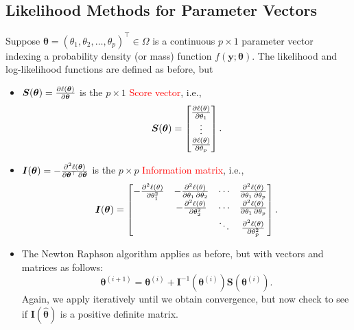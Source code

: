\documentclass[oneside]{book}\usepackage[]{graphicx}\usepackage[svgnames]{xcolor}
\providecommand{\Vector}[1]{\bm{#1}}%
\providecommand{\Matrix}[1]{\bm{#1}}
\begin{document}
\subsection*{Likelihood Methods for Parameter Vectors}
Suppose $ \Vector{\theta}=(\theta_1,\theta_2,\ldots,\theta_p)^\top\in \Omega $ is a continuous $ p\times 1 $ parameter vector
indexing a probability density (or mass) function $ f(\Vector{y};\Vector{\theta}) $. The likelihood and
log-likelihood functions are defined as before, but
\begin{itemize}
      \item $ \Vector{S}(\Vector{\theta})=\pdv{\ell( \Vector{\theta})}{ \Vector{\theta}} $ is the $ p\times 1 $ \textcolor{Red}{Score vector}, i.e.,
            \[ \Vector{S}(\Vector{\theta})=\begin{bmatrix}
                        \pdv{\ell(\theta)}{\theta_1} \\
                        \vdots                       \\
                        \pdv{\ell(\theta)}{\theta_p}
                  \end{bmatrix}. \]
      \item $ \Matrix{I}(\Vector{\theta})=-\pdv{\ell(\Vector{\theta})}{ \Vector{\theta}^\top,\Vector{\theta}} $ is the $ p\times p $ \textcolor{Red}{Information matrix}, i.e.,
            \[ \Matrix{I}(\Vector{\theta})=\begin{bmatrix}
                        -\pdv[order=2]{\ell(\theta)}{\theta_1} & -\pdv{\ell(\theta)}{\theta_1,\theta_2} & \cdots & \pdv{\ell(\theta)}{\theta_1,\theta_p} \\
                                                               & -\pdv[order=2]{\ell(\theta)}{\theta_2} & \cdots & \pdv{\ell(\theta)}{\theta_1,\theta_p} \\
                                                               &                                        & \ddots & \pdv[order=2]{\ell(\theta)}{\theta_p}
                  \end{bmatrix}. \]

\end{itemize}
\begin{itemize}
      \item The Newton Raphson algorithm applies as before, but with vectors and matrices
            as follows:
            \[ \Vector{\theta}^{(i+1)}=\Vector{\theta}^{(i)}+\Matrix{I}^{-1}(\Vector{\theta}^{(i)})\Vector{S}(\Vector{\theta}^{(i)}). \]
            Again, we apply iteratively until we obtain convergence, but now check to
            see if $ \Matrix{I}(\hat{\Vector{\theta}}) $ is a positive definite matrix.
\end{itemize}
\end{document}
